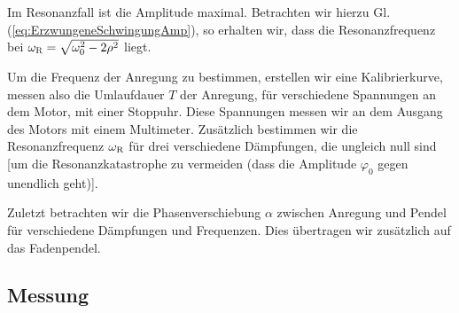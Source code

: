\documentclass[11pt,a4paper,titlepage, ngerman]{article}
\newcommand{\refeq}[1]{Gl. (\ref{eq:#1})}
\begin{document}
			Im Resonanzfall ist die Amplitude maximal. Betrachten wir hierzu \refeq{ErzwungeneSchwingungAmp}, so erhalten wir, dass die Resonanzfrequenz bei $\omega_\textsc{R} = \sqrt{\omega_0^2-2\rho^2}$ liegt.
			
			Um die Frequenz der Anregung zu bestimmen, erstellen wir eine Kalibrierkurve, messen also die Umlaufdauer $T$ der Anregung, für verschiedene Spannungen an dem Motor, mit einer Stoppuhr. Diese Spannungen messen wir an dem Ausgang des Motors mit einem Multimeter.
			Zusätzlich bestimmen wir die Resonanzfrequenz $\omega_\textsc{R}$ für drei verschiedene Dämpfungen, die ungleich null sind [um die Resonanzkatastrophe zu vermeiden (dass die Amplitude $\varphi_0$ gegen unendlich geht)].
				
			Zuletzt betrachten wir die Phasenverschiebung $\alpha$ zwischen Anregung und Pendel für verschiedene Dämpfungen und Frequenzen. Dies übertragen wir zusätzlich auf das Fadenpendel.
		
		\subsection*{Messung}
			
\end{document}
